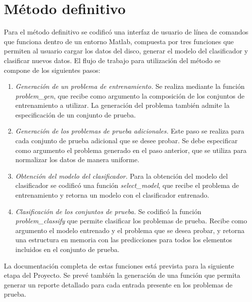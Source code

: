 \documentclass[12pt,bibliography=oldstyle,DIV=12,parskip=half-]{scrreprt}
\begin{document}
%
%
\section{Método definitivo}
%
Para el método definitivo se codificó una interfaz de usuario de línea
de comandos que funciona dentro de un entorno Matlab, compuesta por
tres funciones que permiten al usuario cargar los datos del disco,
generar el modelo del clasificador y clasificar nuevos datos.
El flujo de trabajo para utilización del método se compone de los siguientes pasos:
\begin{enumerate}
\item \emph{Generación de un problema de entrenamiento.}
  Se realiza mediante la función \emph{problem\_gen}, que recibe como
  argumento la composición de los conjuntos de entrenamiento a utilizar.
  La generación del problema también admite la especificación de un
  conjunto de prueba.
\item \emph{Generación de los problemas de prueba adicionales.}
  Este paso se realiza para cada conjunto de prueba adicional que
  se desee probar. Se debe especificar como argumento el problema generado
  en el paso anterior, que se utiliza para normalizar los datos
  de manera uniforme.
\item \emph{Obtención del modelo del clasificador.}
  Para la obtención del modelo del clasificador se codificó una función
  \emph{select\_model}, que recibe el problema de entrenamiento y retorna
  un modelo con el clasificador entrenado.
\item \emph{Clasificación de los conjuntos de prueba.}
  Se codificó la función \emph{problem\_classify} que permite
  clasificar los problemas de prueba. Recibe como argumento el modelo
  entrenado y el problema que se desea probar, y retorna una
  estructura en memoria con las predicciones para todos los elementos
  incluidos en el conjunto de prueba.
\end{enumerate}
La documentación completa de estas funciones está prevista para la
siguiente etapa del Proyecto. Se prevé también la generación de una
función que permita generar un reporte detallado para cada entrada
presente en los problemas de prueba.
\end{document}

